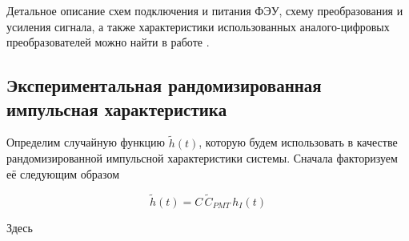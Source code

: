 \documentclass[12pt]{book}
\begin{document}
	Детальное описание схем подключения и питания ФЭУ, схему преобразования и усиления сигнала, а также характеристики использованных аналого-цифровых преобразователей можно найти в работе \cite{SphereDetector2020}.
	
	\subsection{Экспериментальная рандомизированная импульсная характеристика}

	\label{sec:experimental-rir}

	Определим случайную функцию $\tilde{h}(t)$, которую будем использовать в качестве рандомизированной импульсной характеристики системы. Сначала факторизуем её следующим образом
	
	\begin{equation}
		\label{eq:experimental-rir}
		\tilde{h}(t) = C \, \tilde{C}_{PMT} \, h_I(t)
	\end{equation}

	Здесь
	
\end{document}
